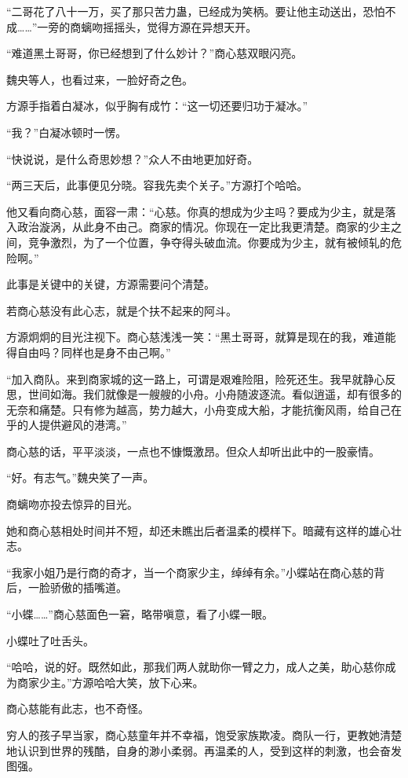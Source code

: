 \begin{this_body}
“二哥花了八十一万，买了那只苦力蛊，已经成为笑柄。要让他主动送出，恐怕不成……”一旁的商螭吻摇摇头，觉得方源在异想天开。

“难道黑土哥哥，你已经想到了什么妙计？”商心慈双眼闪亮。

魏央等人，也看过来，一脸好奇之色。

方源手指着白凝冰，似乎胸有成竹：“这一切还要归功于凝冰。”

“我？”白凝冰顿时一愣。

“快说说，是什么奇思妙想？”众人不由地更加好奇。

“两三天后，此事便见分晓。容我先卖个关子。”方源打个哈哈。

他又看向商心慈，面容一肃：“心慈。你真的想成为少主吗？要成为少主，就是落入政治漩涡，从此身不由己。商家的情况。你现在一定比我更清楚。商家的少主之间，竞争激烈，为了一个位置，争夺得头破血流。你要成为少主，就有被倾轧的危险啊。”

此事是关键中的关键，方源需要问个清楚。

若商心慈没有此心志，就是个扶不起来的阿斗。

方源炯炯的目光注视下。商心慈浅浅一笑：“黑土哥哥，就算是现在的我，难道能得自由吗？同样也是身不由己啊。”

“加入商队。来到商家城的这一路上，可谓是艰难险阻，险死还生。我早就静心反思，世间如海。我们就像是一艘艘的小舟。小舟随波逐流。看似逍遥，却有很多的无奈和痛楚。只有修为越高，势力越大，小舟变成大船，才能抗衡风雨，给自己在乎的人提供避风的港湾。”

商心慈的话，平平淡淡，一点也不慷慨激昂。但众人却听出此中的一股豪情。

“好。有志气。”魏央笑了一声。

商螭吻亦投去惊异的目光。

她和商心慈相处时间并不短，却还未瞧出后者温柔的模样下。暗藏有这样的雄心壮志。

“我家小姐乃是行商的奇才，当一个商家少主，绰绰有余。”小蝶站在商心慈的背后，一脸骄傲的插嘴道。

“小蝶……”商心慈面色一窘，略带嗔意，看了小蝶一眼。

小蝶吐了吐舌头。

“哈哈，说的好。既然如此，那我们两人就助你一臂之力，成人之美，助心慈你成为商家少主。”方源哈哈大笑，放下心来。

商心慈能有此志，也不奇怪。

穷人的孩子早当家，商心慈童年并不幸福，饱受家族欺凌。商队一行，更教她清楚地认识到世界的残酷，自身的渺小柔弱。再温柔的人，受到这样的刺激，也会奋发图强。


\end{this_body}
